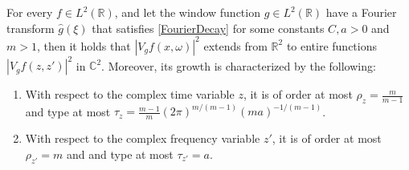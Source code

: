 \documentclass[graybox]{svmult}
\newcommand{\R}{\mathbb{R}}
\newcommand{\C}{\mathbb{C}}
\begin{document}
\begin{lemma}\label{STFTExtension}
    For every $f \in L^2(\R)$, and let the window function $g \in L^2(\mathbb{R})$ have a Fourier transform $\hat{g}(\xi)$ that satisfies \eqref{FourierDecay} for some constants $C, a > 0$ and $m>1$, then it holds that $|V_gf(x,\omega)|^2$ extends from $\R^{2}$ to entire functions $|V_gf(z,z')|^2$ in $\C^2$. Moreover, its growth is characterized by the following:
\begin{enumerate}
    \item With respect to the complex time variable $z$, it is of order at most $\rho_z = \frac{m}{m-1}$ and type at most $\tau_z = \frac{m-1}{m}(2\pi)^{m/(m-1)}(ma)^{-1/(m-1)}$.
    \item With respect to the complex frequency variable $z'$, it is of order at most $\rho_{z'} = m$ and and type at most $\tau_{z'} =a$.
\end{enumerate}
\end{lemma}
\end{document}
